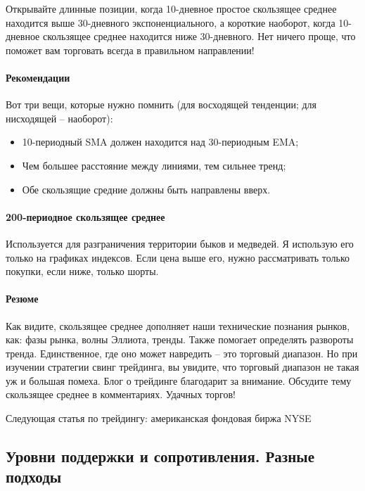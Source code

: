 \documentclass{book}
\begin{document}
Открывайте длинные позиции, когда 10-дневное простое скользящее
среднее находится выше 30-дневного экспоненциального, а короткие
наоборот, когда 10-дневное скользящее среднее находится ниже
30-дневного. Нет ничего проще, что поможет вам торговать всегда в
правильном направлении!

\paragraph{Рекомендации}

Вот три вещи, которые нужно помнить (для восходящей тенденции; для нисходящей – наоборот):
\begin{itemize}
\item     10-периодный SMA должен находится над 30-периодным EMA;
\item     Чем большее расстояние между линиями, тем сильнее тренд;
\item     Обе скользящие средние должны быть направлены вверх.
\end{itemize}

\paragraph{200-периодное скользящее среднее}

Используется для разграничения территории быков и медведей. Я
использую его только на графиках индексов. Если цена выше его, нужно
рассматривать только покупки, если ниже, только шорты.

\paragraph{Резюме}

Как видите, скользящее среднее дополняет наши технические познания рынков, как: фазы рынка, волны Эллиота, тренды. Также помогает определять развороты тренда. Единственное, где оно может навредить – это торговый диапазон. Но при изучении стратегии свинг трейдинга, вы увидите, что торговый диапазон не такая уж и большая помеха. Блог о трейдинге благодарит за внимание. Обсудите тему скользящее среднее в комментариях. Удачных торгов!

Следующая статья по трейдингу: американская фондовая биржа NYSE

\subsection{Уровни поддержки и сопротивления. Разные подходы}
\end{document}
